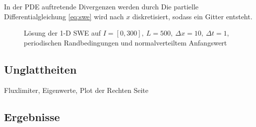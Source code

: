 In der PDE auftretende Divergenzen werden durch 
Die partielle Differentialgleichung \eqref{eq:swe} wird nach $x$ diskretisiert, sodass ein Gitter entsteht.
\begin{figure}
 \centering
 
 \caption{Lösung der 1-D SWE auf $I=[0,300],~L=500,~\Delta x=10,~\Delta t=1$, periodischen Randbedingungen und normalverteiltem Anfangswert}
 \label{fig:sweSolution}
\end{figure}

\cite{evans1998partial}
\subsection{Unglattheiten}
Fluxlimiter, Eigenwerte, Plot der Rechten Seite
\subsection{Ergebnisse}


